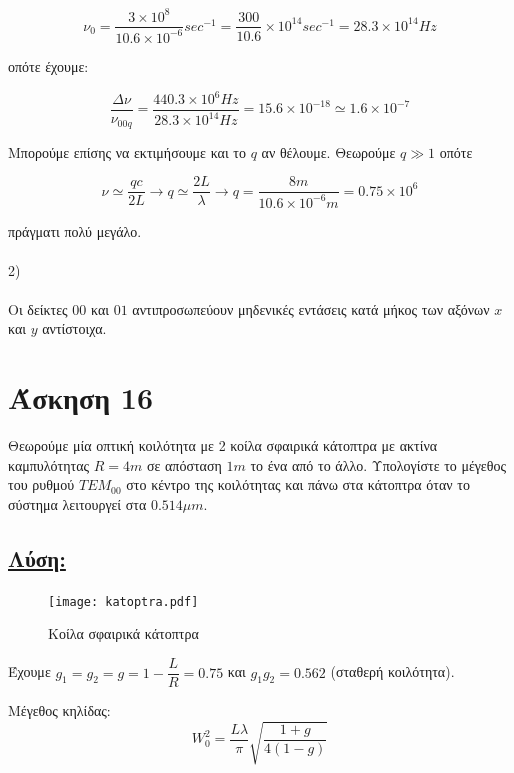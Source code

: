 \documentclass[a4paper,11pt,titlepage]{article}
\begin{document}
\begin{equation}
 \nu_0=\frac{3\times10^8}{10.6\times10^{-6}}sec^{-1}=\frac{300}{10.6}\times10^{14}sec^{-1}=28.3\times10^{14}Hz
\end{equation}

οπότε έχουμε:

\begin{equation}
  \dfrac{\Delta\nu}{\nu_{00q}}=\frac{440.3\times10^6 Hz}{28.3\times10^{14}Hz}=15.6\times10^{-18}\simeq1.6\times10^{-7}
\end{equation}

Μπορούμε επίσης να εκτιμήσουμε και το $q$ αν θέλουμε. Θεωρούμε $q\gg1$ οπότε 

\begin{equation}
\nu\simeq \dfrac{qc}{2L}\longrightarrow q\simeq \dfrac{2L}{\lambda}\longrightarrow q=\dfrac{8m}{10.6\times10^{-6}m}=0.75\times10^6
\end{equation}

πράγματι πολύ μεγάλο.
\\\\
2)
\\\\
Οι δείκτες $00$ και $01$ αντιπροσωπεύουν μηδενικές εντάσεις κατά μήκος των αξόνων $x$ και $y$ αντίστοιχα.

\newpage
\section{Άσκηση 16}

Θεωρούμε μία οπτική κοιλότητα με 2 κοίλα σφαιρικά κάτοπτρα με ακτίνα καμπυλότητας $R=4m$ σε απόσταση $1m$ το ένα από το άλλο. Υπολογίστε το μέγεθος του ρυθμού $TEM_{00}$ στο κέντρο της κοιλότητας και πάνω στα κάτοπτρα όταν το σύστημα λειτουργεί στα $0.514\mu m$.

\subsection*{\underline{Λύση:}}

\begin{figure}[!h]
\centering
\texttt{[image: katoptra.pdf]}\\[0.3cm]
\caption{Κοίλα σφαιρικά κάτοπτρα}
\end{figure}

Έχουμε $g_1=g_2=g=1-\dfrac{L}{R}=0.75$ και $g_1g_2=0.562$ (σταθερή κοιλότητα).

Μέγεθος κηλίδας:
\begin{equation}
 W_0^2=\frac{L\lambda}{\pi}\sqrt{\dfrac{1+g}{4(1-g)}}
\end{equation}
\end{document}
